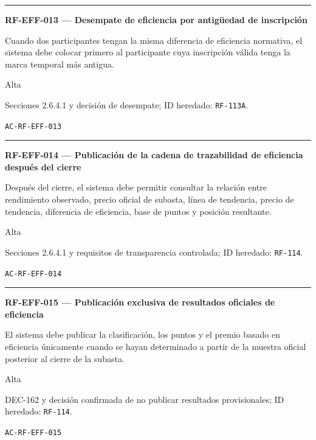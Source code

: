 \documentclass[10pt,letterpaper]{article}
\begin{document}
\vspace{0.25em}\hrule\vspace{0.65em}
\noindent\textbf{RF-EFF-013 --- Desempate de eficiencia por antigüedad de inscripción}\par
\begin{description}[style=nextline,leftmargin=3.15cm,labelwidth=2.8cm,font=\normalfont\bfseries]
\item[Obligación] Cuando dos participantes tengan la misma diferencia de eficiencia normativa, el sistema debe colocar primero al participante cuya inscripción válida tenga la marca temporal más antigua.
\item[Prioridad] Alta
\item[Procedencia] Secciones 2.6.4.1 y decisión de desempate; ID heredado: \texttt{RF-113A}.
\item[Verificación] \texttt{AC-RF-EFF-013}
\end{description}
\vspace{0.25em}\hrule\vspace{0.65em}
\noindent\textbf{RF-EFF-014 --- Publicación de la cadena de trazabilidad de eficiencia después del cierre}\par
\begin{description}[style=nextline,leftmargin=3.15cm,labelwidth=2.8cm,font=\normalfont\bfseries]
\item[Obligación] Después del cierre, el sistema debe permitir consultar la relación entre rendimiento observado, precio oficial de subasta, línea de tendencia, precio de tendencia, diferencia de eficiencia, base de puntos y posición resultante.
\item[Prioridad] Alta
\item[Procedencia] Secciones 2.6.4.1 y requisitos de transparencia controlada; ID heredado: \texttt{RF-114}.
\item[Verificación] \texttt{AC-RF-EFF-014}
\end{description}
\vspace{0.25em}\hrule\vspace{0.65em}
\noindent\textbf{RF-EFF-015 --- Publicación exclusiva de resultados oficiales de eficiencia}\par
\begin{description}[style=nextline,leftmargin=3.15cm,labelwidth=2.8cm,font=\normalfont\bfseries]
\item[Obligación] El sistema debe publicar la clasificación, los puntos y el premio basado en eficiencia únicamente cuando se hayan determinado a partir de la muestra oficial posterior al cierre de la subasta.
\item[Prioridad] Alta
\item[Procedencia] DEC-162 y decisión confirmada de no publicar resultados provisionales; ID heredado: \texttt{RF-114}.
\item[Verificación] \texttt{AC-RF-EFF-015}
\end{description}
\end{document}
